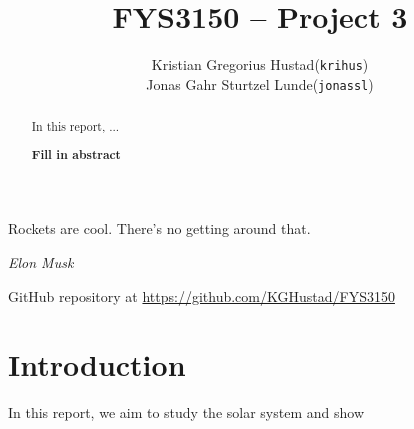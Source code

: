 \documentclass[a4paper]{article}
\begin{document}
\title{FYS3150 -- Project 3}
\author{
    \begin{tabular}{r l}
        Kristian Gregorius Hustad & (\texttt{krihus})\\
        Jonas Gahr Sturtzel Lunde & (\texttt{jonassl})
    \end{tabular}}

\maketitle



\setlength{\epigraphwidth}{0.75\textwidth}
\renewcommand{\epigraphflush}{center}
\renewcommand{\beforeepigraphskip}{50pt}
\renewcommand{\afterepigraphskip}{100pt}
\renewcommand{\epigraphsize}{\normalsize}

\epigraph{Rockets are cool. There's no getting around that.}
{\textit{Elon Musk}}


\begin{abstract}
\noindent
In this report, ...

\textbf{Fill in abstract}
\end{abstract}

\vfill


\begin{center}
    GitHub repository at \url{https://github.com/KGHustad/FYS3150}
\end{center}

\newpage

\newcommand{\half}{\frac{1}{2}}
\newcommand{\dt}{{\Delta t}}
\newcommand{\dx}{{\Delta x}}
\newcommand{\bigO}{{\mathcal{O}}}



\section{Introduction}\label{sec:intro}
\cite{mhj_lecture_notes} %

In this report, we aim to study the solar system and show
\end{document}

